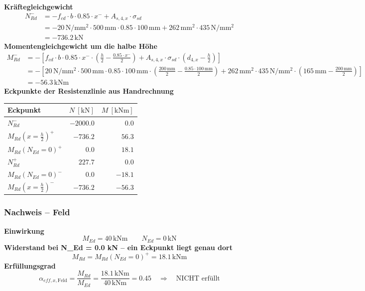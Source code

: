 \documentclass[11pt,a4paper]{article}
\begin{document}
\noindent\textbf{Kräftegleichgewicht}
\begin{equation*}
\begin{aligned}
  N_{Rd}^{-} &= -f_{cd} \cdot b \cdot 0.85 \cdot x^{-} + A_{s,4,x} \cdot \sigma_{sd} \\
  &= -20\,\mathrm{N}/\mathrm{mm}^{2} \cdot 500\,\mathrm{mm} \cdot 0.85 \cdot 100\,\mathrm{mm} + 262\,\mathrm{mm}^{2} \cdot 435\,\mathrm{N}/\mathrm{mm}^{2} \\
  &= -736.2\,\mathrm{kN}
\end{aligned}
\end{equation*}
\noindent\textbf{Momentengleichgewicht um die halbe Höhe}
\begin{equation*}
\begin{aligned}
  M_{Rd}^{-} &= -\left[f_{cd} \cdot b \cdot 0.85 \cdot x^{-} \cdot \left(\tfrac{h}{2} - \tfrac{0.85 \cdot x^{-}}{2}\right) + A_{s,4,x} \cdot \sigma_{sd} \cdot \left(d_{4,x} - \tfrac{h}{2}\right)\right] \\
  &= -\left[20\,\mathrm{N}/\mathrm{mm}^{2} \cdot 500\,\mathrm{mm} \cdot 0.85 \cdot 100\,\mathrm{mm} \cdot \left(\tfrac{200\,\mathrm{mm}}{2} - \tfrac{0.85 \cdot 100\,\mathrm{mm}}{2}\right) + 262\,\mathrm{mm}^{2} \cdot 435\,\mathrm{N}/\mathrm{mm}^{2} \cdot \left(165\,\mathrm{mm} - \tfrac{200\,\mathrm{mm}}{2}\right)\right] \\
  &= -56.3\,\mathrm{kNm}
\end{aligned}
\end{equation*}
\noindent\textbf{Eckpunkte der Resistenzlinie aus Handrechnung}
\begin{longtable}{lrr}
\hline
Eckpunkt & $N\ [\mathrm{kN}]$ & $M\ [\mathrm{kNm}]$ \\
\hline
\endhead
$N_{Rd}^{-}$ & $-2000.0$ & $0.0$ \\
$M_{Rd}(x=\tfrac{h}{2})^{+}$ & $-736.2$ & $56.3$ \\
$M_{Rd}(N_{Ed}=0)^{+}$ & $0.0$ & $18.1$ \\
$N_{Rd}^{+}$ & $227.7$ & $0.0$ \\
$M_{Rd}(N_{Ed}=0)^{-}$ & $0.0$ & $-18.1$ \\
$M_{Rd}(x=\tfrac{h}{2})^{-}$ & $-736.2$ & $-56.3$ \\
\hline
\end{longtable}
\subsubsection{Nachweis – Feld}
\noindent\textbf{Einwirkung}
\begin{equation*}
M_{Ed} = 40\,\mathrm{kNm} \qquad N_{Ed} = 0\,\mathrm{kN}
\end{equation*}
\noindent\textbf{Widerstand bei N\_Ed = 0.0 kN – ein Eckpunkt liegt genau dort}
\begin{equation*}
M_{Rd} = M_{Rd}(N_{Ed}=0)^{+} = 18.1\,\mathrm{kNm}
\end{equation*}
\noindent\textbf{Erfüllungsgrad}
\begin{equation*}
\alpha_{eff,x,\text{Feld}} = \frac{M_{Rd}}{M_{Ed}} = \frac{18.1\,\mathrm{kNm}}{40\,\mathrm{kNm}} = 0.45 \quad \Rightarrow \quad \text{NICHT erfüllt}
\end{equation*}
\end{document}
